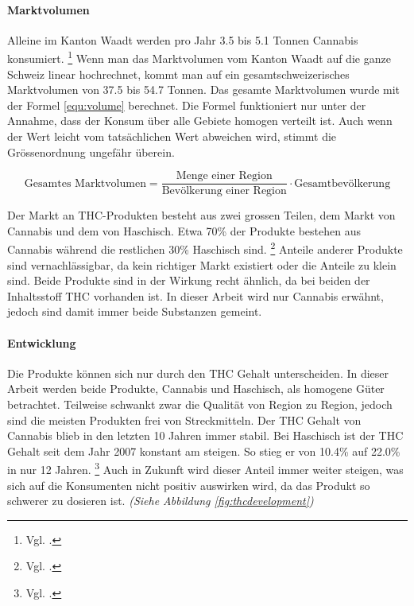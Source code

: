 \documentclass[../main.tex]{subfiles}
\begin{document}
	\paragraph{Marktvolumen}
	Alleine im Kanton Waadt werden pro Jahr 3.5 bis 5.1 Tonnen Cannabis konsumiert.%
	\footnote{Vgl. \cite{zobel}.} 	
	Wenn man das Marktvolumen vom Kanton Waadt auf die ganze Schweiz linear hochrechnet, kommt man auf ein gesamtschweizerisches Marktvolumen von 37.5 bis 54.7 Tonnen.
	Das gesamte Marktvolumen wurde mit der Formel \ref{equ:volume} berechnet.
	Die Formel funktioniert nur unter der Annahme, dass der Konsum über alle Gebiete homogen verteilt ist.
	Auch wenn der Wert leicht vom tatsächlichen Wert abweichen wird, stimmt die Grössenordnung ungefähr überein.
	
	\vspace{7pt}
	\begin{equation}
		\text{Gesamtes Marktvolumen} = \frac{\text{Menge einer Region}}{\text{Bevölkerung einer Region}} \cdot \text{Gesamtbevölkerung}\label{equ:volume}
	\end{equation}
	\vspace{7pt}
	
	\noindent
	Der Markt an THC-Produkten besteht aus zwei grossen Teilen, dem Markt von Cannabis und dem von Haschisch.
	Etwa 70\% der Produkte bestehen aus Cannabis während die restlichen 30\% Haschisch sind.%
	\footnote{Vgl. \cite{zobel}.}
	Anteile anderer Produkte sind vernachlässigbar, da kein richtiger Markt existiert oder die Anteile zu klein sind.
	Beide Produkte sind in der Wirkung recht ähnlich, da bei beiden der Inhaltsstoff THC vorhanden ist.
	In dieser Arbeit wird nur Cannabis erwähnt, jedoch sind damit immer beide Substanzen gemeint.
	
	\paragraph{Entwicklung}
	Die Produkte können sich nur durch den THC Gehalt unterscheiden.
	In dieser Arbeit werden beide Produkte, Cannabis und Haschisch, als homogene Güter betrachtet.
	Teilweise schwankt zwar die Qualität von Region zu Region, jedoch sind die meisten Produkten frei von Streckmitteln.
	Der THC Gehalt von Cannabis blieb in den letzten 10 Jahren immer stabil.
	Bei Haschisch ist der THC Gehalt seit dem Jahr 2007 konstant am steigen.
	So stieg er von 10.4\% auf 22.0\% in nur 12 Jahren.%
	\footnote{Vgl. \cite[15]{sgrm}.}
	Auch in Zukunft wird dieser Anteil immer weiter steigen, was sich auf die Konsumenten nicht positiv auswirken wird, da das Produkt so schwerer zu dosieren ist.
	\textit{(Siehe Abbildung \ref{fig:thcdevelopment})}
	
\end{document}
